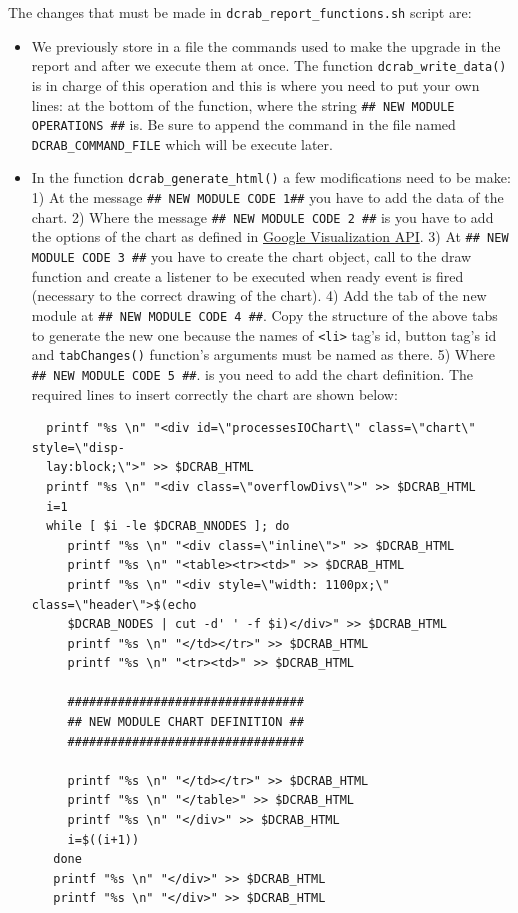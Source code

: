 \documentclass[10pt,a4paper]{report}
\begin{document}
The changes that must be made in \texttt{dcrab\_report\_functions.sh} script are:

\begin{itemize}
  \item We previously store in a file the commands used to make the upgrade in the report and after we execute them at once. The function \texttt{dcrab\_write\_data()} is in charge of this operation and this is where you need to put your own lines: at the bottom of the function, where the string \verb+## NEW MODULE OPERATIONS ##+ is. Be sure to append the command in the file named \verb+DCRAB_COMMAND_FILE+ which will be execute later.
  \item In the function \texttt{dcrab\_generate\_html()} a few modifications need to be make: 1) At the message \verb+## NEW MODULE CODE 1##+ you have to add the data of the chart. 2) Where the message \verb+## NEW MODULE CODE 2 ##+ is you have to add the options of the chart as defined in \href{https://developers.google.com/chart/interactive/docs/reference}{Google Visualization API}. 3) At \verb+## NEW MODULE CODE 3 ##+ you have to create the chart object, call to the draw function and create a listener to be executed when ready event is fired (necessary to the correct drawing of the chart). 4) Add the tab of the new module at \verb+## NEW MODULE CODE 4 ##+. Copy the structure of the above tabs to generate the new one because the names of \verb+<li>+ tag's id, button tag's id and \texttt{tabChanges()} function's arguments must be named as there. 5) Where \verb+## NEW MODULE CODE 5 ##+. is you need to add the chart definition. The required lines to insert correctly the chart are shown below:

  \begin{verbatim}
  printf "%s \n" "<div id=\"processesIOChart\" class=\"chart\" style=\"disp-
  lay:block;\">" >> $DCRAB_HTML
  printf "%s \n" "<div class=\"overflowDivs\">" >> $DCRAB_HTML
  i=1
  while [ $i -le $DCRAB_NNODES ]; do
     printf "%s \n" "<div class=\"inline\">" >> $DCRAB_HTML
     printf "%s \n" "<table><tr><td>" >> $DCRAB_HTML
     printf "%s \n" "<div style=\"width: 1100px;\" class=\"header\">$(echo
     $DCRAB_NODES | cut -d' ' -f $i)</div>" >> $DCRAB_HTML
     printf "%s \n" "</td></tr>" >> $DCRAB_HTML
     printf "%s \n" "<tr><td>" >> $DCRAB_HTML

     #################################
     ## NEW MODULE CHART DEFINITION ##
     #################################

     printf "%s \n" "</td></tr>" >> $DCRAB_HTML
     printf "%s \n" "</table>" >> $DCRAB_HTML
     printf "%s \n" "</div>" >> $DCRAB_HTML
     i=$((i+1))
   done
   printf "%s \n" "</div>" >> $DCRAB_HTML
   printf "%s \n" "</div>" >> $DCRAB_HTML
\end{verbatim}


\end{itemize}
\end{document}
